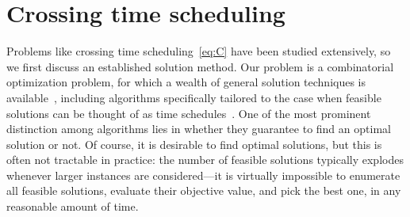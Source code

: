 \documentclass{report}
\theoremstyle{definition}
\theoremstyle{plain}
\begin{document}


\chapter{Crossing time scheduling}\label{chap:crossing-time-scheduling}

Problems like crossing time scheduling~\eqref{eq:C} have been studied extensively, so we
first discuss an established solution method.
%
Our problem is a combinatorial optimization problem, for which a wealth of
general solution techniques is
available~\cite{duIntroductionCombinatorialOptimization2022}, including
algorithms specifically tailored to the case when feasible solutions can be
thought of as time
schedules~\cite{pinedoSchedulingTheoryAlgorithms2016,grahamOptimizationApproximationDeterministic1979}.
%
One of the most prominent distinction among algorithms lies in whether they
guarantee to find an optimal solution or not.
%
Of course, it is desirable to find optimal solutions, but this is often not
tractable in practice: the number of feasible solutions typically explodes
whenever larger instances are considered---it is virtually impossible to
enumerate all feasible solutions, evaluate their objective value, and pick the
best one, in any reasonable amount of time.
\end{document}
